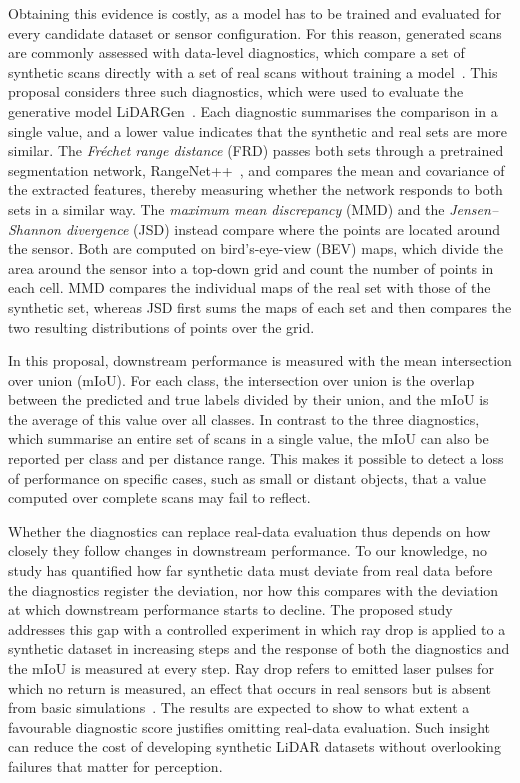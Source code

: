 Obtaining this evidence is costly, as a model has to be trained and evaluated for every candidate dataset or sensor configuration. For this reason, generated scans are commonly assessed with data-level diagnostics, which compare a set of synthetic scans directly with a set of real scans without training a model~\cite{zyrianovLearningGenerateRealistic2022}. This proposal considers three such diagnostics, which were used to evaluate the generative model LiDARGen~\cite{zyrianovLearningGenerateRealistic2022}. Each diagnostic summarises the comparison in a single value, and a lower value indicates that the synthetic and real sets are more similar. The \emph{Fr\'echet range distance} (FRD) passes both sets through a pretrained segmentation network, RangeNet++~\cite{miliotoRangeNet++Fast2019a}, and compares the mean and covariance of the extracted features, thereby measuring whether the network responds to both sets in a similar way. The \emph{maximum mean discrepancy} (MMD) and the \emph{Jensen--Shannon divergence} (JSD) instead compare where the points are located around the sensor. Both are computed on bird's-eye-view (BEV) maps, which divide the area around the sensor into a top-down grid and count the number of points in each cell. MMD compares the individual maps of the real set with those of the synthetic set, whereas JSD first sums the maps of each set and then compares the two resulting distributions of points over the grid.

In this proposal, downstream performance is measured with the mean intersection over union (mIoU). For each class, the intersection over union is the overlap between the predicted and true labels divided by their union, and the mIoU is the average of this value over all classes. In contrast to the three diagnostics, which summarise an entire set of scans in a single value, the mIoU can also be reported per class and per distance range. This makes it possible to detect a loss of performance on specific cases, such as small or distant objects, that a value computed over complete scans may fail to reflect.

Whether the diagnostics can replace real-data evaluation thus depends on how closely they follow changes in downstream performance. To our knowledge, no study has quantified how far synthetic data must deviate from real data before the diagnostics register the deviation, nor how this compares with the deviation at which downstream performance starts to decline. The proposed study addresses this gap with a controlled experiment in which ray drop is applied to a synthetic dataset in increasing steps and the response of both the diagnostics and the mIoU is measured at every step. Ray drop refers to emitted laser pulses for which no return is measured, an effect that occurs in real sensors but is absent from basic simulations~\cite{manivasagamLiDARsimRealisticLiDAR2020a}. The results are expected to show to what extent a favourable diagnostic score justifies omitting real-data evaluation. Such insight can reduce the cost of developing synthetic LiDAR datasets without overlooking failures that matter for perception.